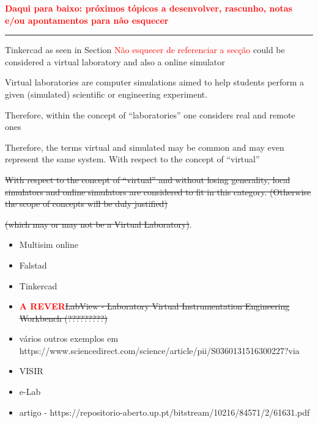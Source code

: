 \textcolor{red}{\textbf{Daqui para baixo: próximos tópicos a desenvolver, rascunho, notas e/ou apontamentos para não esquecer}}

\vspace{1cm}

\vspace{5pt}
\hrule
\vspace{6pt}



Tinkercad as seen in Section \textcolor{red}{Não esquecer de referenciar a secção} could be considered a virtual laboratory and also a online simulator


Virtual laboratories are computer simulations aimed to help students perform a given (simulated) scientific or engineering experiment.

Therefore, within the concept of ``laboratories'' one considers real and remote ones


Therefore, the terms virtual and simulated may be common and may even represent the same system.
With respect to the concept of ``virtual''

\sout{With respect to the concept of ``virtual'' and without losing generality, local simulators and online simulators are considered to fit in this category. (Otherwise the scope of concepts will be duly justified)}

\sout{(which may or may not be a Virtual Laboratory)}.


\begin{itemize}
    \item Multisim online
    \item Falstad
    \item Tinkercad
    \item \textcolor{red}{\textbf{A REVER}}\sout{LabView - Laboratory Virtual Instrumentation Engineering Workbench (?????????)}
    \item vários outros exemplos em     https://www.sciencedirect.com/science/article/pii/S0360131516300227?via%

\end{itemize}


\begin{itemize}
    \item VISIR
    \item e-Lab
    \item artigo - https://repositorio-aberto.up.pt/bitstream/10216/84571/2/61631.pdf
\end{itemize}


